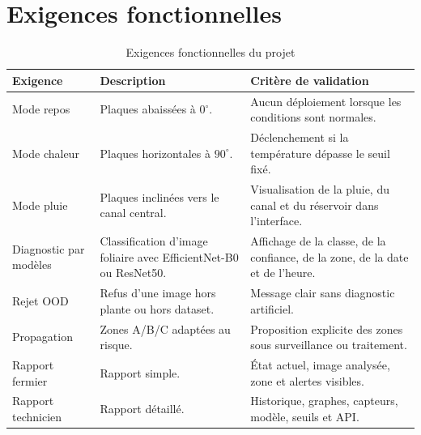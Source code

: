 ﻿\documentclass[11pt,a4paper,openany]{report}
\begin{document}
\section{Exigences fonctionnelles}
\begin{table}[H]
\centering
\small
\renewcommand{\arraystretch}{1.25}

\begin{tabularx}{\textwidth}{|p{3cm}|X|X|}
\hline
\textbf{Exigence} & \textbf{Description} & \textbf{Critère de validation} \\
\hline

Mode repos
& Plaques abaissées à $0^\circ$.
& Aucun déploiement lorsque les conditions sont normales. \\
\hline

Mode chaleur
& Plaques horizontales à $90^\circ$.
& Déclenchement si la température dépasse le seuil fixé. \\
\hline

Mode pluie
& Plaques inclinées vers le canal central.
& Visualisation de la pluie, du canal et du réservoir dans l’interface. \\
\hline

Diagnostic par modèles
& Classification d’image foliaire avec EfficientNet-B0 ou ResNet50.
& Affichage de la classe, de la confiance, de la zone, de la date et de l’heure. \\
\hline

Rejet OOD
& Refus d’une image hors plante ou hors dataset.
& Message clair sans diagnostic artificiel. \\
\hline

Propagation
& Zones A/B/C adaptées au risque.
& Proposition explicite des zones sous surveillance ou traitement. \\
\hline

Rapport fermier
& Rapport simple.
& État actuel, image analysée, zone et alertes visibles. \\
\hline

Rapport technicien
& Rapport détaillé.
& Historique, graphes, capteurs, modèle, seuils et API. \\
\hline

\end{tabularx}

\caption{Exigences fonctionnelles du projet}
\end{table}
\end{document}

